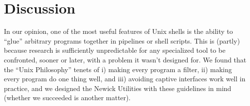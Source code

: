 \documentclass[a4paper,11pt]{article}
\begin{document}
\section*{Discussion}

In our opinion, one of the most useful features of Unix shells is the ability to  ``glue'' arbitrary programs together in pipelines or shell scripts. This is (partly) because research is sufficiently unpredictable for any specialized tool to be confronted, sooner or later, with a problem it wasn't designed for. We found that the ``Unix Philosophy'' tenets of i) making every program a filter, ii) making every program do one thing well, and iii) avoiding captive interfaces work well in practice, and we designed the Newick Utilities with these guidelines in mind (whether we succeeded is another matter).

 

\end{document}
